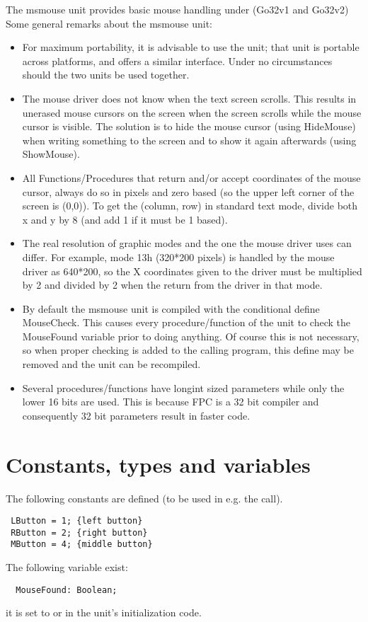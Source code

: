 The msmouse unit provides basic mouse handling under \dos (Go32v1 and Go32v2)
Some general remarks about the msmouse unit:
\begin{itemize}
\item For maximum portability, it is advisable to use the  unit;
that unit is portable across platforms, and offers a similar interface.
Under no circumstances should the two units be used together.
\item The mouse driver does not know when the text screen scrolls. This results
in unerased mouse cursors on the screen when the screen scrolls while the
mouse cursor is visible. The solution is to hide the mouse cursor (using
HideMouse) when writing something to the screen and to show it again
afterwards (using ShowMouse).
\item All Functions/Procedures that return and/or accept coordinates of the mouse
cursor, always do so in pixels and zero based (so the upper left corner of
the screen is (0,0)). To get the (column, row) in standard text mode, divide
both x and y by 8 (and add 1 if it must be 1 based).
\item The real resolution of graphic modes and the one the mouse driver uses can
differ. For example, mode 13h (320*200 pixels) is handled by the mouse driver
as 640*200, so the X coordinates given to the
driver must be multiplied by 2 and divided by 2 when the return from the
driver in that mode.
\item By default the msmouse unit is compiled with the conditional define
MouseCheck. This causes every procedure/function of the unit to check the
MouseFound variable prior to doing anything. Of course this is not necessary,
so when proper checking is added to the calling program, this define may be
removed and the unit can be recompiled.
\item Several procedures/functions have longint sized parameters while only 
the lower 16 bits are used. This is because FPC is a 32 bit compiler and 
consequently 32 bit parameters result in faster code.
\end{itemize}
\section{Constants, types and variables}
The following constants are defined (to be used in e.g. the
 call).
\begin{verbatim}
 LButton = 1; {left button}
 RButton = 2; {right button}
 MButton = 4; {middle button}
\end{verbatim}
The following variable exist: 
\begin{verbatim}
  MouseFound: Boolean;
\end{verbatim}
it is set to  or  in the unit's initialization code.
